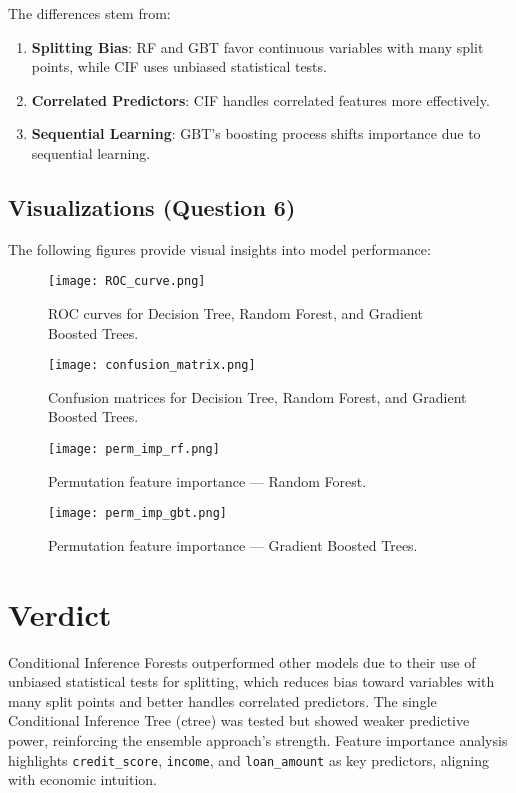 \documentclass[a4paper,12pt,headsepline]{scrartcl} %
\begin{document}
The differences stem from:
\begin{enumerate}
    \item \textbf{Splitting Bias}: RF and GBT favor continuous variables with many split points, while CIF uses unbiased statistical tests.
    \item \textbf{Correlated Predictors}: CIF handles correlated features more effectively.
    \item \textbf{Sequential Learning}: GBT’s boosting process shifts importance due to sequential learning.
\end{enumerate}

\newpage

\subsection{Visualizations (Question 6)}
The following figures provide visual insights into model performance:

\begin{figure}[h]
    \centering
    \texttt{[image: ROC\_curve.png]}
    \caption{ROC curves for Decision Tree, Random Forest, and Gradient Boosted Trees.}
    \label{fig:roc_curves}
\end{figure}

\begin{figure}[h]
    \centering
    \texttt{[image: confusion\_matrix.png]}
    \caption{Confusion matrices for Decision Tree, Random Forest, and Gradient Boosted Trees.}
    \label{fig:confusion_matrix}
\end{figure}

\begin{figure}[h]
    \centering
    \texttt{[image: perm\_imp\_rf.png]}
    \caption{Permutation feature importance — Random Forest.}
    \label{fig:perm_imp_rf}
\end{figure}

\begin{figure}[h]
    \centering
    \texttt{[image: perm\_imp\_gbt.png]}
    \caption{Permutation feature importance — Gradient Boosted Trees.}
    \label{fig:perm_imp_gbt}
\end{figure}



\section{Verdict}
Conditional Inference Forests outperformed other models due to their use of unbiased statistical tests for splitting, which reduces bias toward variables with many split points and better handles correlated predictors. The single Conditional Inference Tree (ctree) was tested but showed weaker predictive power, reinforcing the ensemble approach’s strength. Feature importance analysis highlights \texttt{credit\_score}, \texttt{income}, and \texttt{loan\_amount} as key predictors, aligning with economic intuition.
\end{document}
